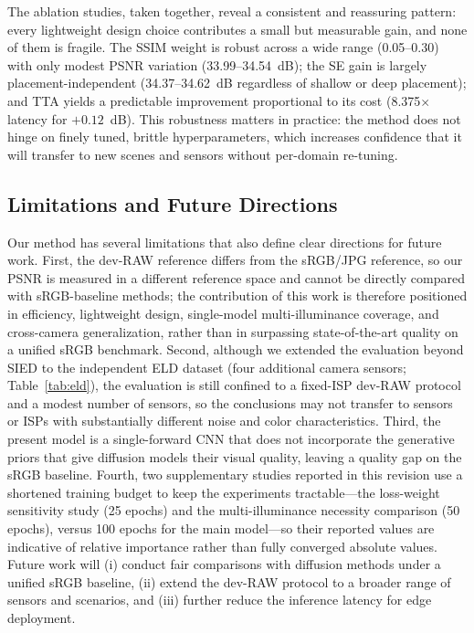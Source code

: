 \documentclass[remotesensing,article,accept,moreauthors]{Definitions/mdpi}
\begin{document}
The ablation studies, taken together, reveal a consistent and reassuring pattern: every lightweight design choice contributes a small but measurable gain, and none of them is fragile. The SSIM weight is robust across a wide range (0.05--0.30) with only modest PSNR variation (33.99--34.54~dB); the SE gain is largely placement-independent (34.37--34.62~dB regardless of shallow or deep placement); and TTA yields a predictable improvement proportional to its cost (8.375$\times$ latency for $+0.12$~dB). This robustness matters in practice: the method does not hinge on finely tuned, brittle hyperparameters, which increases confidence that it will transfer to new scenes and sensors without per-domain re-tuning.

\subsection{Limitations and Future Directions}

Our method has several limitations that also define clear directions for future work. First, the dev-RAW reference differs from the sRGB/JPG reference, so our PSNR is measured in a different reference space and cannot be directly compared with sRGB-baseline methods; the contribution of this work is therefore positioned in efficiency, lightweight design, single-model multi-illuminance coverage, and cross-camera generalization, rather than in surpassing state-of-the-art quality on a unified sRGB benchmark. Second, although we extended the evaluation beyond SIED to the independent ELD dataset (four additional camera sensors; Table~\ref{tab:eld}), the evaluation is still confined to a fixed-ISP dev-RAW protocol and a modest number of sensors, so the conclusions may not transfer to sensors or ISPs with substantially different noise and color characteristics. Third, the present model is a single-forward CNN that does not incorporate the generative priors that give diffusion models their visual quality, leaving a quality gap on the sRGB baseline. Fourth, two supplementary studies reported in this revision use a shortened training budget to keep the experiments tractable---the loss-weight sensitivity study (25 epochs) and the multi-illuminance necessity comparison (50 epochs), versus 100 epochs for the main model---so their reported values are indicative of relative importance rather than fully converged absolute values. Future work will (i) conduct fair comparisons with diffusion methods under a unified sRGB baseline, (ii) extend the dev-RAW protocol to a broader range of sensors and scenarios, and (iii) further reduce the inference latency for edge deployment.
\end{document}
